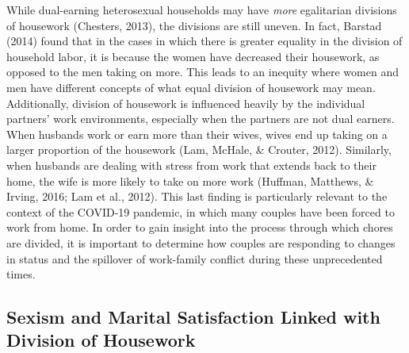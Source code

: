 \documentclass[
  english,
  man]{apa6}
\begin{document}
While dual-earning heterosexual households may have \emph{more} egalitarian divisions of housework (Chesters, 2013), the divisions are still uneven. In fact, Barstad (2014) found that in the cases in which there is greater equality in the division of household labor, it is because the women have decreased their housework, as opposed to the men taking on more. This leads to an inequity where women and men have different concepts of what equal division of housework may mean. Additionally, division of housework is influenced heavily by the individual partners' work environments, especially when the partners are not dual earners. When husbands work or earn more than their wives, wives end up taking on a larger proportion of the housework (Lam, McHale, \& Crouter, 2012). Similarly, when husbands are dealing with stress from work that extends back to their home, the wife is more likely to take on more work (Huffman, Matthews, \& Irving, 2016; Lam et al., 2012). This last finding is particularly relevant to the context of the COVID-19 pandemic, in which many couples have been forced to work from home. In order to gain insight into the process through which chores are divided, it is important to determine how couples are responding to changes in status and the spillover of work-family conflict during these unprecedented times.

\hypertarget{sexism-and-marital-satisfaction-linked-with-division-of-housework}{%
\subsection{Sexism and Marital Satisfaction Linked with Division of Housework}\label{sexism-and-marital-satisfaction-linked-with-division-of-housework}}
\end{document}
